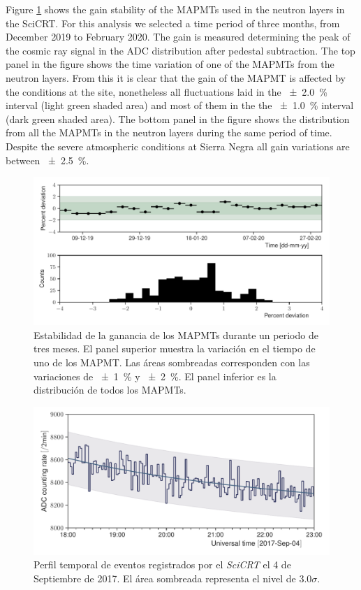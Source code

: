 Figure \ref{fig:mip-stability} shows the gain stability of the MAPMTs used in the neutron layers in the SciCRT. For this analysis we selected a time period of three months, from December \num{2019} to February \num{2020}. The gain is measured determining the peak of the cosmic ray signal in the ADC distribution after pedestal subtraction. The top panel in the figure shows the time variation of one of the MAPMTs from the neutron layers. From this it is clear that the gain of the MAPMT is affected by the conditions at the site, nonetheless all fluctuations laid in the \SI{\pm 2.0}{\percent} interval (light green shaded area) and most of them in the the \SI{\pm 1.0}{\percent} interval (dark green shaded area). The bottom panel in the figure shows the distribution from all the MAPMTs in the neutron layers during the same period of time. Despite the severe atmospheric conditions at Sierra Negra all gain variations are between \SI{\pm 2.5}{\percent}.

\begin{figure}
        \centering
        \includegraphics[width=\textwidth]{neutron-mip_stability.pdf}
        \caption{Estabilidad de la ganancia de los MAPMTs durante un periodo de tres meses. El panel superior muestra la variación en el tiempo de uno de los MAPMT. Las áreas sombreadas corresponden con las variaciones de \SI{\pm 1}{\percent} y \SI{\pm 2}{\percent}. El panel inferior es la distribución de todos los MAPMTs.}
        \label{fig:mip-stability}
\end{figure}



\begin{figure}
        \centering
        \includegraphics[width=\textwidth]{neutron-170904.pdf}
        \caption{Perfil temporal de eventos registrados por el \emph{SciCRT} el \num{4} de Septiembre de \num{2017}. El área sombreada representa el nivel de $3.0\sigma$.}
        \label{fig:september-04}
\end{figure}

